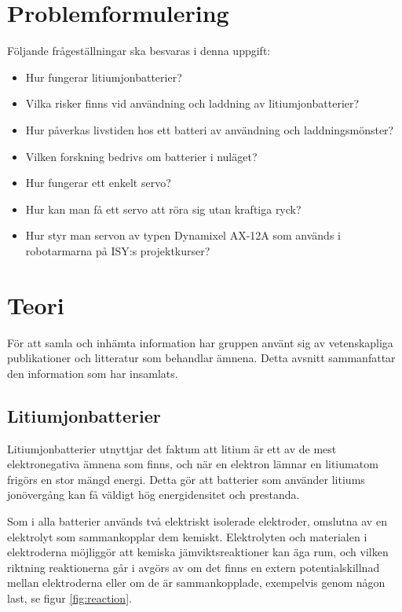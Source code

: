 \documentclass[a4paper,12pt]{article}
\begin{document}
\section{Problemformulering}
\label{sec:problem}
Följande frågeställningar ska besvaras i denna uppgift:
\begin{itemize}
\item Hur fungerar litiumjonbatterier?

\item Vilka risker finns vid användning och laddning av litiumjonbatterier?

\item Hur påverkas livstiden hos ett batteri av användning och laddningsmönster?

\item Vilken forskning bedrivs om batterier i nuläget?

\item Hur fungerar ett enkelt servo?

\item Hur kan man få ett servo att röra sig utan kraftiga ryck?

\item Hur styr man servon av typen Dynamixel AX-12A som används i robotarmarna på ISY:s projektkurser?

\end{itemize}

\section{Teori}
För att samla och inhämta information har gruppen använt sig av vetenskapliga publikationer och litteratur som behandlar ämnena. Detta avsnitt sammanfattar den information som har insamlats.

\subsection{Litiumjonbatterier}
Litiumjonbatterier utnyttjar det faktum att litium är ett av de mest elektronegativa ämnena som finns, och när en elektron lämnar en litiumatom frigörs en stor mängd energi. Detta gör att batterier som använder litiums jonövergång kan få väldigt hög energidensitet och prestanda.

Som i alla batterier används två elektriskt isolerade elektroder, omslutna av en elektrolyt som sammankopplar dem kemiskt. Elektrolyten och materialen i elektroderna möjliggör att kemiska jämviktsreaktioner kan äga rum, och vilken riktning reaktionerna går i avgörs av om det finns en extern potentialskillnad mellan elektroderna eller om de är sammankopplade, exempelvis genom någon last, se figur \ref{fig:reaction}. \cite{glaize13}
\end{document}
